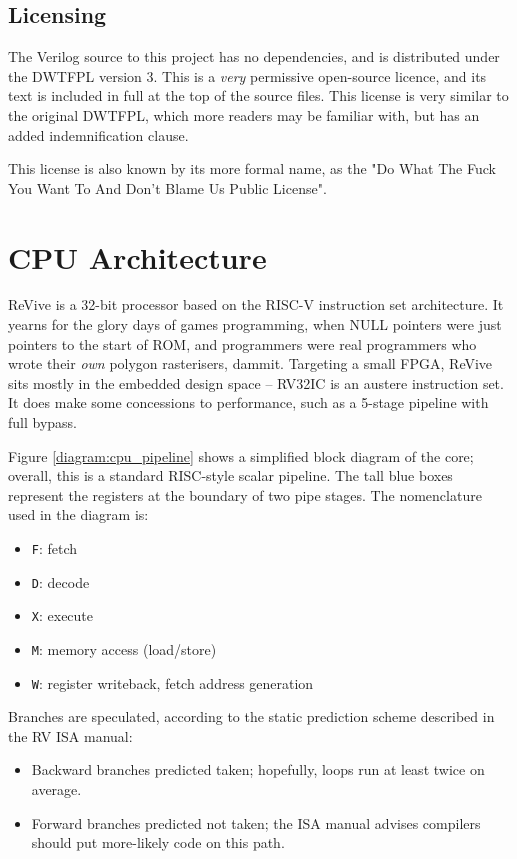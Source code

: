 \documentclass{article}
\begin{document}
\subsection{Licensing}

The Verilog source to this project has no dependencies, and is distributed under the DWTFPL version 3. This is a \textit{very} permissive open-source licence, and its text is included in full at the top of the source files. This license is very similar to the original DWTFPL, which more readers may be familiar with, but has an added indemnification clause.

This license is also known by its more formal name, as the "Do What The Fuck You Want To And Don't Blame Us Public License".

\section{CPU Architecture}

ReVive is a 32-bit processor based on the RISC-V instruction set architecture. It yearns for the glory days of games programming, when NULL pointers were just pointers to the start of ROM, and programmers were real programmers who wrote their \textit{own} polygon rasterisers, dammit. Targeting a small FPGA, ReVive sits mostly in the embedded design space -- RV32IC is an austere instruction set. It does make some concessions to performance, such as a 5-stage pipeline with full bypass.

Figure \ref{diagram:cpu_pipeline} shows a simplified block diagram of the core; overall, this is a standard RISC-style scalar pipeline. The tall blue boxes represent the registers at the boundary of two pipe stages. The nomenclature used in the diagram is:

\begin{itemize}
\item \texttt{F}: fetch
\item \texttt{D}: decode
\item \texttt{X}: execute
\item \texttt{M}: memory access (load/store)
\item \texttt{W}: register writeback, fetch address generation
\end{itemize}

Branches are speculated, according to the static prediction scheme described in the RV ISA manual:

\begin{itemize}
\item Backward branches predicted taken; hopefully, loops run at least twice on average.
\item Forward branches predicted not taken; the ISA manual advises compilers should put more-likely code on this path.
\end{itemize}
\end{document}
